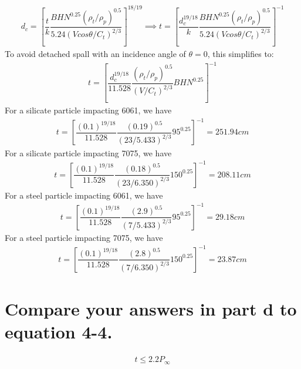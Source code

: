 \documentclass[onecolumn,10pt]{jhwhw}
\begin{document}
\begin{align*}
d_c = \left[ \dfrac{t}{k} \dfrac{BHN^{0.25} \left( \rho_t/\rho_p \right)^{0.5}}{5.24\left( V cos \theta / C_t \right)^{2/3}} \right]^{18/19}
\implies
t = \left[ \dfrac{d_c^{19/18}}{k} \dfrac{BHN^{0.25} \left( \rho_t/\rho_p \right)^{0.5}}{5.24\left( V cos \theta / C_t \right)^{2/3}} \right]^{-1}
\end{align*}
To avoid detached spall with an incidence angle of $\theta = 0$, this simplifies to:
\begin{align*}
t = \left[\dfrac{d_c^{19/18}}{11.528} \dfrac{\left( \rho_t/\rho_p \right)^{0.5}}{\left( V / C_t \right)^{2/3}} BHN^{0.25} \right]^{-1}
\end{align*}
\noindent For a silicate particle impacting 6061, we have
\begin{align*}
t = \left[\dfrac{(0.1)^{19/18}}{11.528} \dfrac{\left( 0.19 \right)^{0.5}}{\left( 23/5.433 \right)^{2/3}} 95^{0.25} \right]^{-1} = 251.94 cm
\end{align*}
\noindent For a silicate particle impacting 7075, we have
\begin{align*}
t = \left[\dfrac{(0.1)^{19/18}}{11.528} \dfrac{\left( 0.18 \right)^{0.5}}{\left( 23/6.350 \right)^{2/3}} 150^{0.25} \right]^{-1} = 208.11 cm
\end{align*}
\noindent For a steel particle impacting 6061, we have
\begin{align*}
t = \left[\dfrac{(0.1)^{19/18}}{11.528} \dfrac{\left( 2.9 \right)^{0.5}}{\left( 7/5.433 \right)^{2/3}} 95^{0.25} \right]^{-1} = 29.18 cm
\end{align*}
\noindent For a steel particle impacting 7075, we have
\begin{align*}
t = \left[\dfrac{(0.1)^{19/18}}{11.528} \dfrac{\left( 2.8 \right)^{0.5}}{\left( 7/6.350 \right)^{2/3}} 150^{0.25} \right]^{-1} = 23.87 cm
\end{align*}

\part{Compare your answers in part d to equation 4-4.}
\begin{align*}
t \leq 2.2 P_{\infty}
\end{align*}
\end{document}
